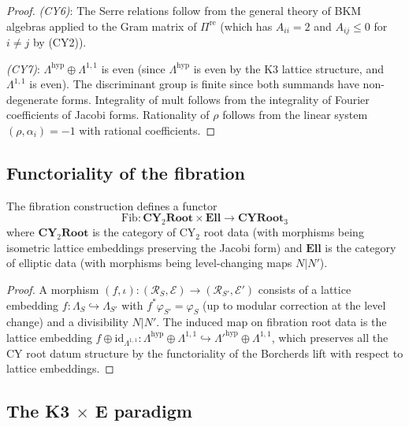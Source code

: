 \begin{proof}
\emph{(CY6)}: The Serre relations follow from the general theory of BKM algebras applied to the Gram matrix of $\Pi^{\mathrm{re}}$ (which has $A_{ii} = 2$ and $A_{ij} \leq 0$ for $i \neq j$ by (CY2)).

\emph{(CY7)}: $\Lambda^{\mathrm{hyp}} \oplus \Lambda^{1,1}$ is even (since $\Lambda^{\mathrm{hyp}}$ is even by the K3 lattice structure, and $\Lambda^{1,1}$ is even). The discriminant group is finite since both summands have non-degenerate forms. Integrality of $\mathrm{mult}$ follows from the integrality of Fourier coefficients of Jacobi forms. Rationality of $\rho$ follows from the linear system $(\rho, \alpha_i) = -1$ with rational coefficients.
\end{proof}

\subsection{Functoriality of the fibration}
\label{ssec:fibration-functoriality}

\begin{proposition}
\label{prop:fib-functorial}

The fibration construction defines a functor
\[
 \mathrm{Fib} \colon \mathbf{CY}_2\mathbf{Root} \times \mathbf{Ell} \longrightarrow \mathbf{CYRoot}_3
\]
where $\mathbf{CY}_2\mathbf{Root}$ is the category of CY$_2$ root data (with morphisms being isometric lattice embeddings preserving the Jacobi form) and $\mathbf{Ell}$ is the category of elliptic data (with morphisms being level-changing maps $N | N'$).
\end{proposition}

\begin{proof}
A morphism $(f, \iota) \colon (\mathcal{R}_S, \mathcal{E}) \to (\mathcal{R}_{S'}, \mathcal{E}')$ consists of a lattice embedding $f \colon \Lambda_S \hookrightarrow \Lambda_{S'}$ with $f^*\varphi_{S'} = \varphi_S$ (up to modular correction at the level change) and a divisibility $N | N'$. The induced map on fibration root data is the lattice embedding $f \oplus \mathrm{id}_{\Lambda^{1,1}} \colon \Lambda^{\mathrm{hyp}} \oplus \Lambda^{1,1} \hookrightarrow \Lambda'^{\mathrm{hyp}} \oplus \Lambda^{1,1}$, which preserves all the CY root datum structure by the functoriality of the Borcherds lift with respect to lattice embeddings.
\end{proof}


\subsection{The K3 $\times$ E paradigm}
\label{ssec:k3-times-e-paradigm}

